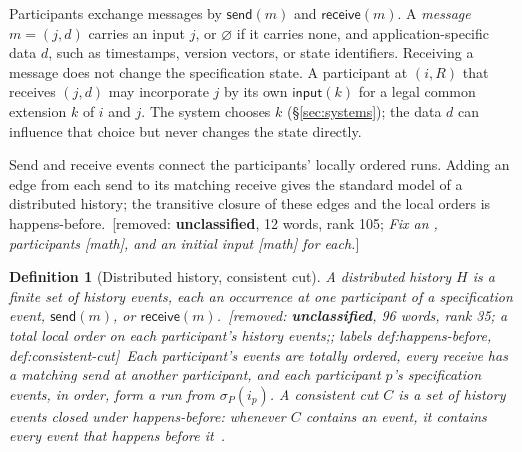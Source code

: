 \documentclass[sigconf]{cidr-2027}
\newtheorem{definition}{Definition}
\theoremstyle{remark}
\newcommand{\removednote}[1]{{\color{cutred}\footnotesize\,[removed: #1]\,}}
\begin{document}
Participants exchange messages by $\mathsf{send}(m)$ and $\mathsf{receive}(m)$. \textcolor{newblue}{A \emph{message} $m=(j,d)$ carries an input $j$, or $\varnothing$ if it
carries none, and application-specific data $d$, such as timestamps, version
vectors, or state identifiers.} Receiving a message does not change the
specification state. \textcolor{newblue}{A participant at $(i,R)$ that receives $(j,d)$ may incorporate $j$ by its own $\mathsf{input}(k)$ for a legal common extension $k$ of $i$ and $j$.} \textcolor{newblue}{The system chooses $k$ (\S\ref{sec:systems}); the data $d$ can
influence that choice but never changes the state directly.}

Send and receive events connect the participants' locally ordered runs. Adding
an edge from each send to its matching receive gives the standard model of a
distributed history; the transitive closure of these edges and the local orders
is happens-before. \removednote{\textbf{unclassified}, 12 words, rank 105; \textit{Fix an , participants [math], and an initial input [math] for each.}}

\begin{definition}[Distributed history, consistent cut]
\label{def:distributed-history}
\textcolor{newblue}{A \emph{distributed history} $H$ is a finite set of \emph{history events}, each
an occurrence at one participant of a specification event, $\mathsf{send}(m)$,
or $\mathsf{receive}(m)$.} \removednote{\textbf{unclassified}, 96 words, rank 35; \textit{a total local order on each participant's history events;}; labels def:happens-before, def:consistent-cut} \textcolor{newblue}{Each participant's events are totally ordered, every
receive has a matching send at another participant, and each participant $p$'s
specification events, in order, form a run from $\sigma_P(i_p)$.} \textcolor{newblue}{A
\emph{consistent cut} $C$ is a set of history events closed under
happens-before: whenever $C$ contains an event, it contains every event that
happens before it~\cite{lamport1978time,chandy1985distributed}.}
\end{definition}
\end{document}
